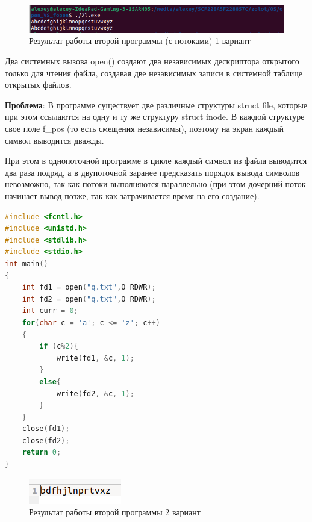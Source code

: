 \documentclass[12pt]{report}
\begin{document}
\begin{figure}[H]
	\centering
	\includegraphics[scale=0.66]{2lout.png}
	\caption{Результат работы второй программы (с потоками) 1 вариант}
	\label{fig:prog_02_thread}
\end{figure}

\clearpage

Два системных вызова open() создают два независимых дескриптора открытого только для чтения файла, создавая две независимых записи в системной таблице открытых файлов.

\textbf{Проблема}: В программе существует две различные структуры struct file, которые при этом ссылаются на одну и ту же структуру struct inode. В каждой структуре свое поле f\_pos (то есть смещения независимы), поэтому на экран каждый символ выводится дважды.

При этом в однопоточной программе в цикле каждый символ из файла выводится два раза подряд, а в двупоточной заранее предсказать порядок вывода символов невозможно, так как потоки выполняются параллельно (при этом дочерний поток начинает вывод позже, так как затрачивается время на его создание).

\begin{lstlisting}[language=c, label=p2thread, caption=Вторая программа 2 вариант]
#include <fcntl.h>
#include <unistd.h>
#include <stdlib.h>
#include <stdio.h>
int main() 
{
  	int fd1 = open("q.txt",O_RDWR);
 	int fd2 = open("q.txt",O_RDWR);
  	int curr = 0;
  	for(char c = 'a'; c <= 'z'; c++)
  	{
  		if (c%2){
			write(fd1, &c, 1);
		}
  		else{
			write(fd2, &c, 1);
		}
  	}
  	close(fd1);
  	close(fd2);
	return 0;
}
\end{lstlisting}

\begin{figure}[H]
	\centering
	\includegraphics[scale=1]{22out.png}
	\caption{Результат работы второй программы 2 вариант}
	\label{fig:prog_022}
\end{figure}
\end{document}
